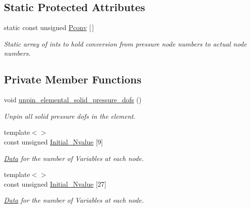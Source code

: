 \subsection*{Static Protected Attributes}
\begin{DoxyCompactItemize}
\item 
static const unsigned \hyperlink{classoomph_1_1QPVDElementWithContinuousPressure_ab8b1c13d0ec7c7734520e52feefb24ad}{Pconv} \mbox{[}$\,$\mbox{]}
\begin{DoxyCompactList}\small\item\em Static array of ints to hold conversion from pressure node numbers to actual node numbers. \end{DoxyCompactList}\end{DoxyCompactItemize}
\subsection*{Private Member Functions}
\begin{DoxyCompactItemize}
\item 
void \hyperlink{classoomph_1_1QPVDElementWithContinuousPressure_a55d0fa7d145270c4b7a8b127b9afe818}{unpin\+\_\+elemental\+\_\+solid\+\_\+pressure\+\_\+dofs} ()
\begin{DoxyCompactList}\small\item\em Unpin all solid pressure dofs in the element. \end{DoxyCompactList}\item 
{\footnotesize template$<$$>$ }\\const unsigned \hyperlink{classoomph_1_1QPVDElementWithContinuousPressure_a42872f76378f52eacae5b989132dc604}{Initial\+\_\+\+Nvalue} \mbox{[}9\mbox{]}
\begin{DoxyCompactList}\small\item\em \hyperlink{classoomph_1_1Data}{Data} for the number of Variables at each node. \end{DoxyCompactList}\item 
{\footnotesize template$<$$>$ }\\const unsigned \hyperlink{classoomph_1_1QPVDElementWithContinuousPressure_ab8123df4b82b2d69c813338a0c60f3b1}{Initial\+\_\+\+Nvalue} \mbox{[}27\mbox{]}
\begin{DoxyCompactList}\small\item\em \hyperlink{classoomph_1_1Data}{Data} for the number of Variables at each node. \end{DoxyCompactList}\end{DoxyCompactItemize}
